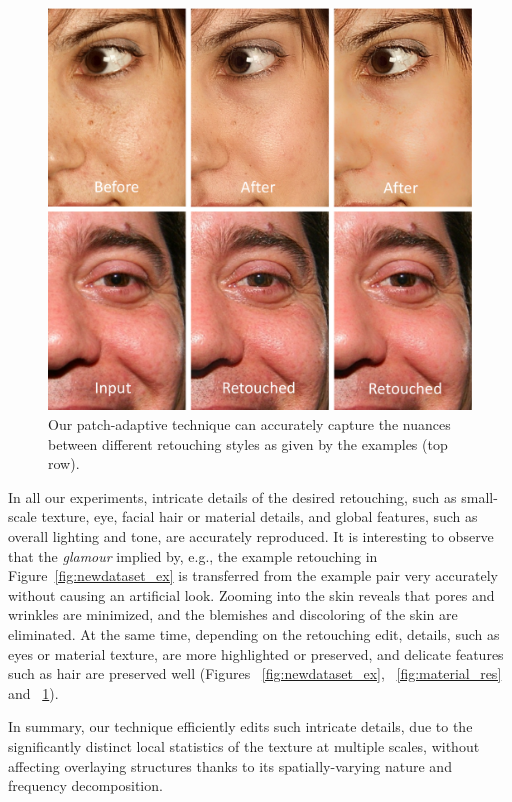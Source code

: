 \begin{figure}[th] %
    \centering
	\includegraphics[width=0.8\columnwidth]{Chapters/detail-retouching-figs/Nuances.pdf}
    \caption{Our patch-adaptive technique can accurately capture the nuances between different
    retouching styles as given by the examples (top row).}
\label{fig:retouchingstyles}
\end{figure}

In all our experiments, intricate details of the desired retouching, such as small-scale texture, eye, facial hair or material details, and global features, such as overall lighting and tone, are accurately reproduced. It is interesting to observe that the \emph{glamour} implied by, e.g., the example retouching in Figure~\ref{fig:newdataset_ex} is transferred from the example pair very accurately without causing an artificial look. Zooming into the skin reveals that pores and wrinkles are minimized, and the blemishes and discoloring of the skin are eliminated. At the same time, depending on the retouching edit, details, such as eyes or material texture, are more highlighted or preserved, and delicate features such as hair are preserved well (Figures ~\ref{fig:newdataset_ex}, ~\ref{fig:material_res} and ~\ref{fig:retouchingstyles}). 


In summary, our technique efficiently edits such intricate details, due to the significantly distinct local statistics of the texture at multiple scales, without affecting overlaying structures thanks to its spatially-varying nature and frequency decomposition. 

